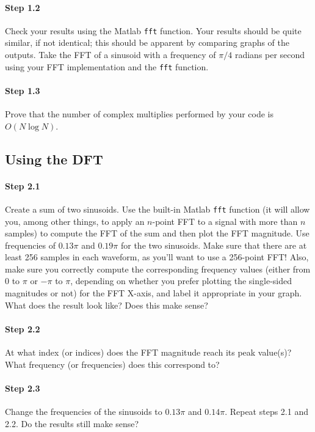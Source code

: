 \paragraph{Step 1.2} 
Check your results using the Matlab \verb|fft| function. Your results
should be quite similar, if not identical; this should be apparent by
comparing graphs of the outputs. Take the FFT of a sinusoid with a
frequency of $\pi/4$ radians per second using your FFT implementation
and the \verb|fft| function.

\paragraph{Step 1.3}
Prove that the number of complex multiplies performed by your code is
$O(N \log N)$.

\subsection{Using the DFT}

\paragraph{Step 2.1} 
Create a sum of two sinusoids. Use the built-in Matlab \verb|fft|
function (it will allow you, among other things, to apply an $n$-point
FFT to a signal with more than $n$ samples) to compute the FFT of the
sum and then plot the FFT magnitude. Use frequencies of $0.13\pi$ and
$0.19\pi$ for the two sinusoids. Make sure that there are at least 256
samples in each waveform, as you'll want to use a 256-point FFT! Also,
make sure you correctly compute the corresponding frequency values
(either from 0 to $\pi$ or $-\pi$ to $\pi$, depending on whether you
prefer plotting the single-sided magnitudes or not) for the FFT
X-axis, and label it appropriate in your graph. What does the result
look like? Does this make sense?


\paragraph{Step 2.2} At what index (or indices) does the FFT magnitude
reach its peak value(s)? What frequency (or frequencies) does this
correspond to?


\paragraph{Step 2.3} Change the frequencies of the sinusoids to
$0.13\pi$ and $0.14\pi$. Repeat steps 2.1 and 2.2. Do the results
still make sense?



